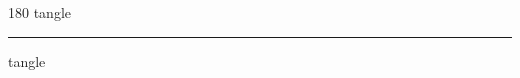 
\begin{frame}
\begin{center}
\begin{turn}{180}
{\fontsize{2.5cm}{1em}\selectfont tangle}
\end{turn}
\vspace{1em}\par  
\hrule
\vspace{1em}\par  
{\fontsize{2.5cm}{1em}\selectfont tangle}
\end{center}
\end{frame}
